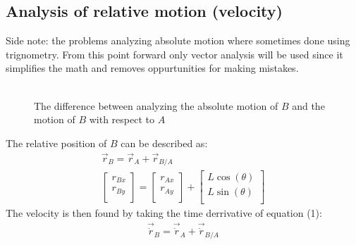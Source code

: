 \documentclass[11pt, a4paper]{article}
\begin{document}
\subsection{Analysis of relative motion (velocity)}
Side note: the problems analyzing absolute motion where sometimes done using trignometry. From this point forward only vector analysis will be used since it simplifies the math and removes oppurtunities for making mistakes.\\
\\
\begin{figure}[h]
  \centering
  \qquad
  \caption{The difference between analyzing the absolute motion of $B$ and the motion of $B$ with respect to $A$}
\end{figure}
The relative position of $B$ can be described as:
\begin{gather}
  \vec{r}_B = \vec{r}_A + \vec{r}_{B/A}\\
  \begin{bmatrix} r_{Bx}\\ r_{By}\\ \end{bmatrix} = \begin{bmatrix} r_{Ax}\\ r_{Ay}\\ \end{bmatrix} + \begin{bmatrix} L\cos(\theta)\\ L\sin(\theta)\\ \end{bmatrix} 
\end{gather}
The velocity is then found by taking the time derrivative of equation (1):
\begin{gather}
  \vec{\dot{r}}_B = \vec{\dot{r}}_A + \vec{\dot{r}}_{B/A}
\end{gather}
\end{document}
